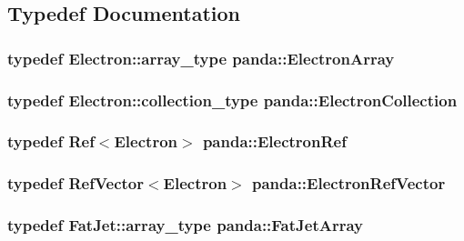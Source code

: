 \subsection{Typedef Documentation}
\hypertarget{namespacepanda_a0cc09e44a594f5e3484863e0cabcf1d2}{
\subsubsection[{ElectronArray}]{\setlength{\rightskip}{0pt plus 5cm}typedef {\bf Electron::array\_\-type} {\bf panda::ElectronArray}}}
\label{namespacepanda_a0cc09e44a594f5e3484863e0cabcf1d2}
\hypertarget{namespacepanda_ae08c35528aface79eb4f0671ae514fe2}{
\subsubsection[{ElectronCollection}]{\setlength{\rightskip}{0pt plus 5cm}typedef {\bf Electron::collection\_\-type} {\bf panda::ElectronCollection}}}
\label{namespacepanda_ae08c35528aface79eb4f0671ae514fe2}
\hypertarget{namespacepanda_a0c21bff4783a1d39ba9c58e66d65f77d}{
\subsubsection[{ElectronRef}]{\setlength{\rightskip}{0pt plus 5cm}typedef {\bf Ref}$<${\bf Electron}$>$ {\bf panda::ElectronRef}}}
\label{namespacepanda_a0c21bff4783a1d39ba9c58e66d65f77d}
\hypertarget{namespacepanda_a4e1055d408d62ead8d90dde25b4a41d2}{
\subsubsection[{ElectronRefVector}]{\setlength{\rightskip}{0pt plus 5cm}typedef {\bf RefVector}$<${\bf Electron}$>$ {\bf panda::ElectronRefVector}}}
\label{namespacepanda_a4e1055d408d62ead8d90dde25b4a41d2}
\hypertarget{namespacepanda_a78151d325b1db9db73a5d43336ec3da8}{
\subsubsection[{FatJetArray}]{\setlength{\rightskip}{0pt plus 5cm}typedef {\bf FatJet::array\_\-type} {\bf panda::FatJetArray}}}
